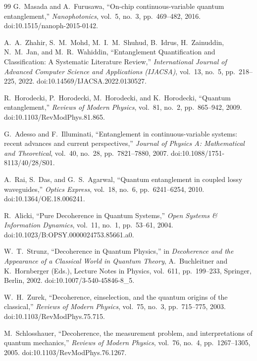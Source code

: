 \begin{thebibliography}{99}
	G.~Masada and A.~Furusawa,
	``On-chip continuous-variable quantum entanglement,''
	\textit{Nanophotonics},
	vol.~5, no.~3, pp.~469--482, 2016.
	doi:10.1515/nanoph-2015-0142.
	
	A.~A.~Zhahir, S.~M.~Mohd, M.~I.~M.~Shuhud, B.~Idrus, H.~Zainuddin, N.~M.~Jan, and M.~R.~Wahiddin,
	``Entanglement Quantification and Classification: A Systematic Literature Review,''
	\textit{International Journal of Advanced Computer Science and Applications (IJACSA)},
	vol.~13, no.~5, pp.~218--225, 2022.
	doi:10.14569/IJACSA.2022.0130527.
	
	R.~Horodecki, P.~Horodecki, M.~Horodecki, and K.~Horodecki,
	``Quantum entanglement,''
	\textit{Reviews of Modern Physics},
	vol.~81, no.~2, pp.~865--942, 2009.
	doi:10.1103/RevModPhys.81.865.
	
	G.~Adesso and F.~Illuminati,
	``Entanglement in continuous-variable systems: recent advances and current perspectives,''
	\textit{Journal of Physics A: Mathematical and Theoretical},
	vol.~40, no.~28, pp.~7821--7880, 2007.
	doi:10.1088/1751-8113/40/28/S01.
	
	A.~Rai, S.~Das, and G.~S.~Agarwal,
	``Quantum entanglement in coupled lossy waveguides,''
	\textit{Optics Express},
	vol.~18, no.~6, pp.~6241--6254, 2010.
	doi:10.1364/OE.18.006241.
	
	R.~Alicki,
	``Pure Decoherence in Quantum Systems,''
	\textit{Open Systems \& Information Dynamics},
	vol.~11, no.~1, pp.~53--61, 2004.
	doi:10.1023/B:OPSY.0000024753.85661.a0.
	
	W.~T.~Strunz,
	``Decoherence in Quantum Physics,''
	in \textit{Decoherence and the Appearance of a Classical World in Quantum Theory},
	A.~Buchleitner and K.~Hornberger (Eds.),
	Lecture Notes in Physics, vol.~611, pp.~199--233,
	Springer, Berlin, 2002.
	doi:10.1007/3-540-45846-8\_5.
	
	W.~H.~Zurek,
	``Decoherence, einselection, and the quantum origins of the classical,''
	\textit{Reviews of Modern Physics},
	vol.~75, no.~3, pp.~715--775, 2003.
	doi:10.1103/RevModPhys.75.715.
	
	M.~Schlosshauer,
	``Decoherence, the measurement problem, and interpretations of quantum mechanics,''
	\textit{Reviews of Modern Physics},
	vol.~76, no.~4, pp.~1267--1305, 2005.
	doi:10.1103/RevModPhys.76.1267.
	

\end{thebibliography}
